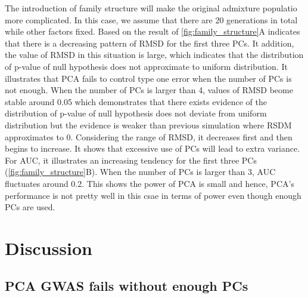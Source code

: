 \documentclass[12pt]{article}
\begin{document}
The introduction of family structure will make the original admixture populatio more complicated.
In this case, we assume that there are 20 generations in total while other factors fixed.
Based on the result of \cref{fig:family_structure}A indicates that there is a decreasing pattern of RMSD for the first three PCs.
It addition, the value of RMSD in this situation is large, which indicates that the distribution of p-value of null hypothesis does not approximate to uniform distribution.
It illustrates that PCA fails to control type one error when the number of PCs is not enough.
When the number of PCs is larger than 4, values of RMSD beome stable around 0.05 which demonstrates that there exists evidence of the distribution of p-value of null hypothesis does not deviate from uniform distribution but the evidence is weaker than previous simulation where RSDM approximates to 0.
Considering the range of RMSD, it decreases first and then begins to increase.
It shows that excessive use of PCs will lead to extra variance.
For AUC, it illustrates an increasing tendency for the first three PCs (\cref{fig:family_structure}B).
When the number of PCs is larger than 3, AUC fluctuates around 0.2.
This shows the power of PCA is small and hence, PCA's performance is not pretty well in this csae in terms of power even though enough PCs are used. 


\section{Discussion}

\subsection{PCA GWAS fails without enough PCs}
\end{document}
